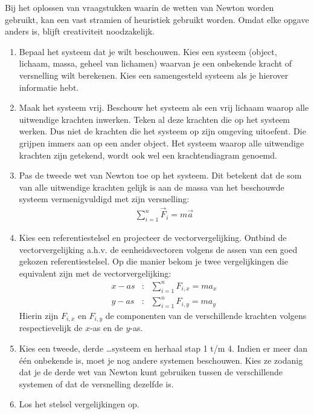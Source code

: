 \documentclass{ximera}
\begin{document}
	\author{Bart Lambregs}
    \xmsource\xmuitleg






	Bij het oplossen van vraagstukken waarin de wetten van Newton worden gebruikt, kan een vast stramien of heuristiek gebruikt worden. Omdat elke opgave anders is, blijft creativiteit noodzakelijk.
	\begin{enumerate}
	\item Bepaal het systeem dat je wilt beschouwen. Kies een systeem (object, lichaam, massa, geheel van lichamen) waarvan je een onbekende kracht of versnelling wilt berekenen. Kies een samengesteld systeem als je hierover informatie hebt.
	\item Maak het systeem vrij. Beschouw het systeem als een vrij lichaam waarop alle uitwendige krachten inwerken. Teken al deze krachten die op het systeem werken. Dus niet de krachten die het systeem op zijn omgeving uitoefent. Die grijpen immers aan op een ander object. Het systeem waarop alle uitwendige krachten zijn getekend, wordt ook wel een krachtendiagram genoemd.
	\item Pas de tweede wet van Newton toe op het systeem. Dit betekent dat de som van alle uitwendige krachten gelijk is aan de massa van het beschouwde systeem vermenigvuldigd met zijn versnelling:
	\begin{eqnarray*}
	\sum_{i=1}^n\vec{F}_i=m\vec{a}
	\end{eqnarray*}
	\item Kies een referentiestelsel en projecteer de vectorvergelijking. Ontbind de vectorvergelijking a.h.v. de eenheidsvectoren volgens de assen van een goed gekozen referentiestelsel. Op die manier bekom je
	twee vergelijkingen die equivalent zijn met de vectorvergelijking:
	\begin{eqnarray*}
	x-as&:&\sum_{i=1}^nF_{i,x}=ma_x\\
	y-as&:&\sum_{i=1}^nF_{i,y}=ma_y
	\end{eqnarray*}
	Hierin zijn $F_{i,x}$ en $F_{i,y}$ de componenten van de verschillende krachten volgens respectievelijk de $x$-as en de $y$-as.
	\item Kies een tweede, derde \ldots systeem en herhaal stap 1 t/m 4. Indien er meer dan \'e\'en onbekende is, moet je nog andere systemen beschouwen. Kies ze zodanig dat je de derde wet van Newton kunt gebruiken tussen de verschillende systemen of dat de versnelling dezelfde is.
	\item Los het stelsel vergelijkingen op.
	\end{enumerate}
	
\end{document}
